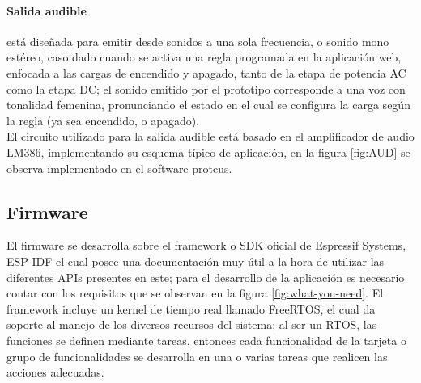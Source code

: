 %		
%	
	
	\paragraph{Salida audible}
		está diseñada para emitir desde sonidos a una sola frecuencia, o sonido mono estéreo, caso dado cuando se activa una regla programada en la aplicación web, enfocada a las cargas de encendido y apagado, tanto de la etapa de potencia AC como la etapa DC; el sonido emitido por el prototipo corresponde a una voz con tonalidad femenina, pronunciando el estado en el cual se configura la carga según la regla (ya sea encendido, o apagado).\\
		
		El circuito utilizado para la salida audible está basado en el amplificador de audio LM386, implementando su esquema típico de aplicación, en la figura \ref{fig:AUD} se observa implementado en el software proteus.
		
		
				
\subsection{Firmware}

El firmware se desarrolla sobre el framework o SDK oficial de Espressif Systems, ESP-IDF el cual posee una documentación \cite{ES} muy útil a la hora de utilizar las diferentes APIs presentes en este; para el desarrollo de la aplicación es necesario contar con los requisitos que se observan en la figura \ref{fig:what-you-need}. El framework incluye un kernel de tiempo real llamado FreeRTOS, el cual da soporte al manejo de los diversos recursos del sistema; al ser un RTOS, las funciones se definen mediante tareas, entonces cada funcionalidad de la tarjeta o grupo de funcionalidades se desarrolla en una o varias tareas que realicen las acciones adecuadas.

